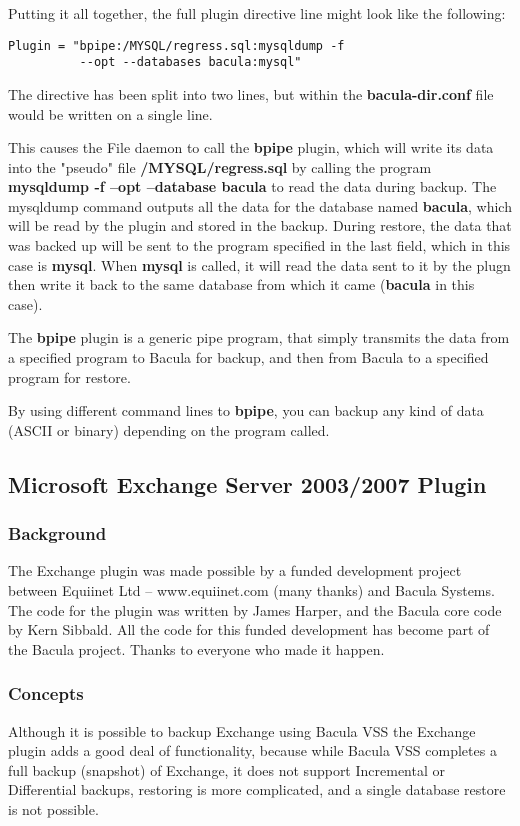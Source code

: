 Putting it all together, the full plugin directive line might look
like the following:

\begin{verbatim}
Plugin = "bpipe:/MYSQL/regress.sql:mysqldump -f 
          --opt --databases bacula:mysql"
\end{verbatim}

The directive has been split into two lines, but within the {\bf bacula-dir.conf} file
would be written on a single line.

This causes the File daemon to call the {\bf bpipe} plugin, which will write
its data into the "pseudo" file {\bf /MYSQL/regress.sql} by calling the 
program {\bf mysqldump -f --opt --database bacula} to read the data during
backup. The mysqldump command outputs all the data for the database named
{\bf bacula}, which will be read by the plugin and stored in the backup.
During restore, the data that was backed up will be sent to the program
specified in the last field, which in this case is {\bf mysql}.  When
{\bf mysql} is called, it will read the data sent to it by the plugn
then write it back to the same database from which it came ({\bf bacula}
in this case).

The {\bf bpipe} plugin is a generic pipe program, that simply transmits 
the data from a specified program to Bacula for backup, and then from Bacula to 
a specified program for restore.

By using different command lines to {\bf bpipe},
you can backup any kind of data (ASCII or binary) depending
on the program called.

\subsection{Microsoft Exchange Server 2003/2007 Plugin}
\subsubsection{Background}
The Exchange plugin was made possible by a funded development project
between Equiinet Ltd -- www.equiinet.com (many thanks) and Bacula Systems.
The code for the plugin was written by James Harper, and the Bacula core
code by Kern Sibbald.  All the code for this funded development has become
part of the Bacula project.  Thanks to everyone who made it happen.

\subsubsection{Concepts}
Although it is possible to backup Exchange using Bacula VSS the Exchange 
plugin adds a good deal of functionality, because while Bacula VSS
completes a full backup (snapshot) of Exchange, it does
not support Incremental or Differential backups, restoring is more
complicated, and a single database restore is not possible.

